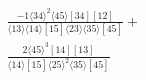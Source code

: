 \documentclass[varwidth, border=5pt]{standalone}
\begin{document}
\begin{my}
$\begin{gathered}
\scriptscriptstyle\frac{-1⟨34⟩^2⟨45⟩[34][12]}{⟨13⟩⟨14⟩[15]⟨23⟩⟨35⟩[45]}+\\
\scriptscriptstyle\frac{2⟨45⟩^3[14][13]}{⟨14⟩[15]⟨25⟩^2⟨35⟩[45]}\phantom{+}
\end{gathered}$
\end{my}
\end{document}
